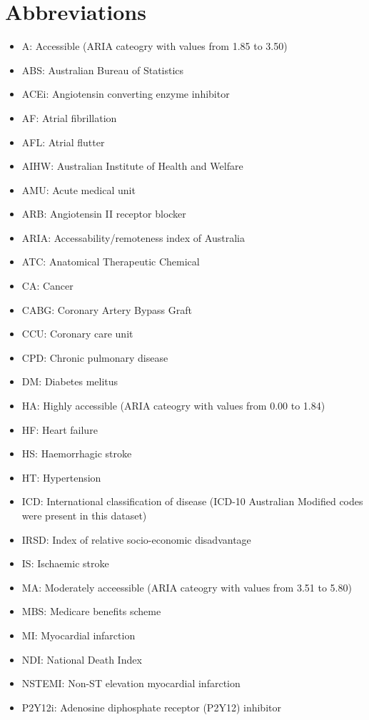 \documentclass[11pt]{article}
\begin{document}
\section{Abbreviations} 

\begin{itemize}
\item A: Accessible (ARIA cateogry with values from 1.85 to 3.50)
\item ABS: Australian Bureau of Statistics
\item ACEi: Angiotensin converting enzyme inhibitor
\item AF: Atrial fibrillation
\item AFL: Atrial flutter
\item AIHW: Australian Institute of Health and Welfare
\item AMU: Acute medical unit
\item ARB: Angiotensin II receptor blocker
\item ARIA: Accessability/remoteness index of Australia
\item ATC: Anatomical Therapeutic Chemical 
\item CA: Cancer
\item CABG: Coronary Artery Bypass Graft
\item CCU: Coronary care unit
\item CPD: Chronic pulmonary disease
\item DM: Diabetes melitus
\item HA: Highly accessible (ARIA cateogry with values from 0.00 to 1.84)
\item HF: Heart failure
\item HS: Haemorrhagic stroke
\item HT: Hypertension
\item ICD: International classification of disease (ICD-10 Australian Modified codes were present in this dataset)
\item IRSD: Index of relative socio-economic disadvantage
\item IS: Ischaemic stroke
\item MA: Moderately acceessible (ARIA cateogry with values from 3.51 to 5.80)
\item MBS: Medicare benefits scheme
\item MI: Myocardial infarction
\item NDI: National Death Index
\item NSTEMI: Non-ST elevation myocardial infarction
\item P2Y12i: Adenosine diphosphate receptor (P2Y12) inhibitor

\end{itemize}
\end{document}
